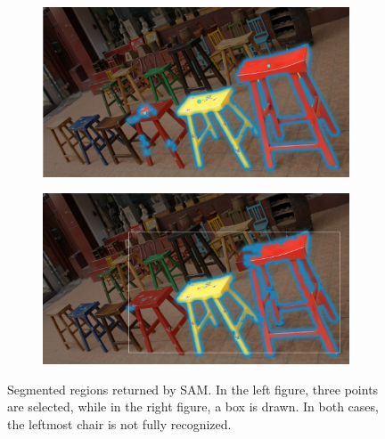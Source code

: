 \begin{figure}[H]
  \centering
  \begin{subfigure}[b]{0.48\textwidth}
    \centering
    \includegraphics[width=\textwidth]{img/sam-segmented-after-point.png}
    \label{fig:sam_point}
  \end{subfigure}
  \hfill
  \begin{subfigure}[b]{0.48\textwidth}
    \centering
    \includegraphics[width=\textwidth]{img/sam-segment-bounding-box.png}
    \label{fig:sam_box}
  \end{subfigure}
  \caption[Segmented regions returned by SAM]{Segmented regions returned by SAM. In the left figure, three points are selected, while in the right figure, a box is drawn. In both cases, the leftmost chair is not fully recognized.}
  \label{fig:sam_segments}
\end{figure}
